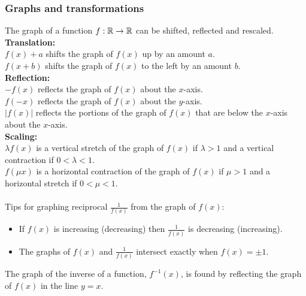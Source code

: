 \documentclass[10pt, a4paper]{article}
\begin{document}
\subsubsection{Graphs and transformations}
The graph of a function $f : \mathbb{R} \rightarrow \mathbb{R}$ can be shifted, reflected and rescaled. \\
\textbf{Translation:} \\
$f(x) + a$ shifts the graph of $f(x)$ up by an amount $a$. \\
$f(x + b)$ shifts the graph of $f(x)$ to the left by an amount $b$. \\
\textbf{Reflection:} \\
$-f(x)$ reflects the graph of $f(x)$ about the $x$-axis. \\
$f(-x)$ reflects the graph of $f(x)$ about the $y$-axis. \\
$|f(x)|$ reflects the portions of the graph of $f(x)$ that are below the $x$-axis about the $x$-axis. \\
\textbf{Scaling:} \\
$\lambda f(x)$ is a vertical stretch of the graph of $f(x)$ if $\lambda > 1$ and a vertical contraction if $0 < \lambda < 1$. \\
$f(\mu x)$ is a horizontal contraction of the graph of $f(x)$ if $\mu > 1$ and a horizontal stretch if $0 < \mu < 1$. \\
\\
Tips for graphing reciprocal $\frac{1}{f(x)}$ from the graph of $f(x)$:
\begin{itemize}
    \item If $f(x)$ is increasing (decreasing) then $\frac{1}{f(x)}$ is decreasing (increasing).
    \item The graphs of $f(x)$ and $\frac{1}{f(x)}$ intersect exactly when $f(x) = \pm 1$.
\end{itemize}
The graph of the inverse of a function, $f ^ {-1} (x)$, is found by reflecting the graph of $f(x)$ in the line $y = x$.
\end{document}
